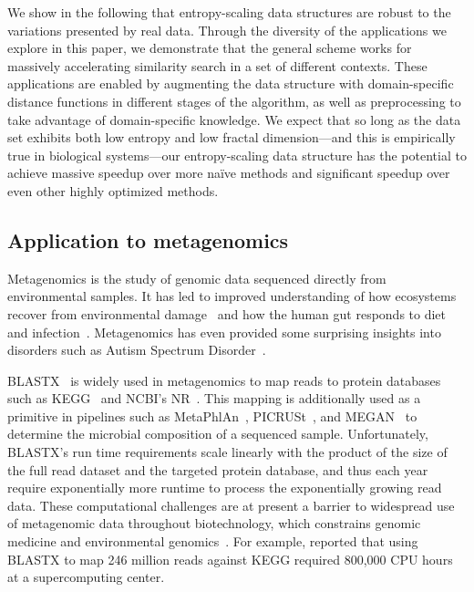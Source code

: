 \documentclass[review,preprint,12pt]{elsarticle}
\renewcommand{\cite}{\citep} %
\theoremstyle{definition}
\theoremstyle{remark}
\numberwithin{equation}{section}
\begin{document}
We show in the following that entropy-scaling data structures are robust to the variations presented by real data.
Through the diversity of the applications we explore in this paper, we demonstrate that the general scheme works for massively accelerating similarity search in a set of different contexts.
These applications are enabled by augmenting the data structure with domain-specific distance functions in different stages of the algorithm, as well as preprocessing to take advantage of domain-specific knowledge.
We expect that so long as the data set exhibits both low entropy and low 
fractal dimension---and this is empirically true in biological systems---our 
entropy-scaling data structure has the potential to achieve massive speedup 
over more na\"ive methods and significant speedup over even other highly 
optimized methods.

\subsection{Application to metagenomics}

Metagenomics is the study of genomic data sequenced directly from environmental
samples.
It has led to improved understanding of how ecosystems recover
from environmental damage~\cite{tyson2004community} and how the human gut responds 
to diet
and infection~\cite{david2014host}.
Metagenomics has even provided some surprising insights into disorders 
such as Autism Spectrum Disorder~\cite{macfabe2012short}.

BLASTX~\cite{altschul1990basic} is widely used in metagenomics to map
reads to protein databases such as KEGG~\cite{kanehisa2000kegg} and NCBI's 
NR~\cite{sayers2011database}.
This mapping is additionally used as a primitive in pipelines such as MetaPhlAn~\cite{segata2012metagenomic}, 
PICRUSt~\cite{langille2013predictive}, and MEGAN~\cite{huson2011integrative} to
determine the microbial composition of a sequenced sample.
Unfortunately, BLASTX's run time requirements scale linearly with the product 
of the size of the full read dataset and the targeted protein database, and 
thus each year require exponentially more runtime to process the exponentially 
growing read data. 
These computational challenges are at present a barrier to widespread use of 
metagenomic data throughout biotechnology, which constrains genomic medicine 
and environmental genomics~\cite{frank2008gastrointestinal}.
For example, \citet{mackelprang2011metagenomic} reported that using BLASTX to map 246
million reads against KEGG required 800,000 CPU hours at a supercomputing 
center.
\end{document}
